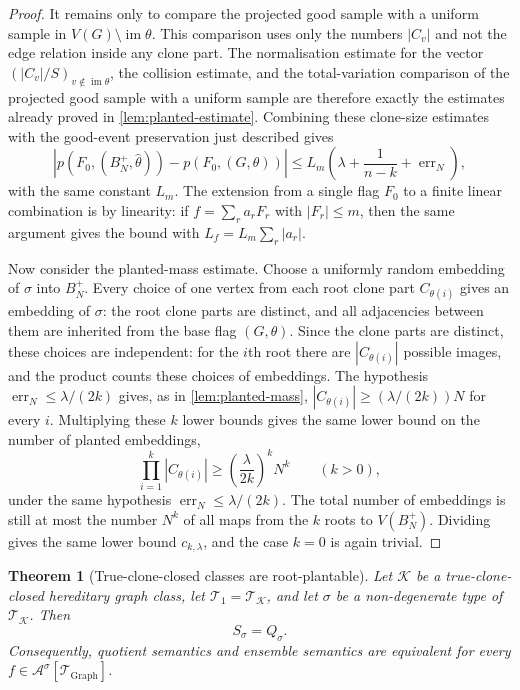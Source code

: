 \documentclass[11pt]{article}
\newtheorem{theorem}{Theorem}
\theoremstyle{definition}
\newcommand{\A}{\mathcal{A}}
\newcommand{\K}{\mathcal{K}}
\newcommand{\T}{\mathcal{T}}
\begin{document}
\begin{proof}
It remains only to compare the projected good sample with a uniform sample in
$V(G)\setminus\operatorname{im}\theta$.  This comparison uses only the numbers
$|C_v|$ and not the edge relation inside any clone part.  The normalisation
estimate for the vector $(|C_v|/S)_{v\notin\operatorname{im}\theta}$, the
collision estimate, and the total-variation comparison of the projected good
sample with a uniform sample are therefore exactly the estimates already proved
in \cref{lem:planted-estimate}.  Combining these clone-size estimates with the
good-event preservation just described gives
\[
  \left|p(F_0,(B_N^+,\widehat\theta))-p(F_0,(G,\theta))\right|
  \le
  L_m\left(\lambda+\frac1{n-k}+\operatorname{err}_N\right),
\]
with the same constant $L_m$.  The extension from a single flag $F_0$ to a
finite linear combination is by linearity: if $f=\sum_r a_rF_r$ with
$|F_r|\le m$, then the same argument gives the bound with
$L_f=L_m\sum_r|a_r|$.

Now consider the planted-mass estimate.  Choose a uniformly random embedding of
$\sigma$ into $B_N^+$.  Every choice of one vertex from each root clone part
$C_{\theta(i)}$ gives an embedding of $\sigma$: the root clone parts are
distinct, and all adjacencies between them are inherited from the base flag
$(G,\theta)$.  Since the clone parts are distinct, these choices are independent:
for the $i$th root there are $|C_{\theta(i)}|$ possible images, and the product counts
these choices of embeddings.  The
hypothesis $\operatorname{err}_N\le\lambda/(2k)$ gives, as in
\cref{lem:planted-mass},
$|C_{\theta(i)}|\ge(\lambda/(2k))N$ for every $i$.  Multiplying these $k$
lower bounds gives the same lower bound on the number of planted embeddings,
\[
  \prod_{i=1}^k |C_{\theta(i)}|
  \ge
  \left(\frac{\lambda}{2k}\right)^k N^k
  \qquad(k>0),
\]
under the same hypothesis $\operatorname{err}_N\le\lambda/(2k)$.  The total
number of embeddings is still at most the number $N^k$ of all maps from the
$k$ roots to $V(B_N^+)$.  Dividing gives the
same lower bound $c_{k,\lambda}$, and the case $k=0$ is again trivial.
\end{proof}

\begin{theorem}[True-clone-closed classes are root-plantable]\label{thm:true-clone-root-plantable}
Let $\K$ be a true-clone-closed hereditary graph class, let
$\T_1=\T_\K$, and let $\sigma$ be a non-degenerate type of $\T_\K$.  Then
\[
  S_\sigma=Q_\sigma.
\]
Consequently, quotient semantics and ensemble semantics are equivalent for every
$f\in\A^\sigma[\T_{\mathrm{Graph}}]$.
\end{theorem}
\end{document}
